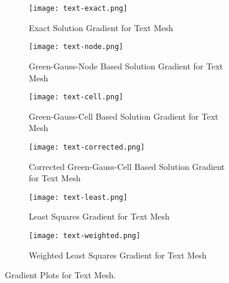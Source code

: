\documentclass{article}
\begin{document}
\begin{figure}[H]
  \centering
  \captionsetup{font=small}
  \begin{subfigure}{.45\textwidth}
    \centering
    \texttt{[image: text-exact.png]}
    \caption{Exact Solution Gradient for Text Mesh}
    \label{fig:41}
  \end{subfigure}%
  \hfill
  \begin{subfigure}{.45\textwidth}
    \centering
    \texttt{[image: text-node.png]}
    \caption{Green-Gauss-Node Based Solution Gradient for Text Mesh}
    \label{fig:42}
  \end{subfigure}

  \begin{subfigure}{.45\textwidth}
    \centering
    \texttt{[image: text-cell.png]}
    \caption{Green-Gauss-Cell Based Solution Gradient for Text Mesh}
    \label{fig:43}
  \end{subfigure}%
  \hfill
  \begin{subfigure}{.45\textwidth}
    \centering
    \texttt{[image: text-corrected.png]}
    \caption{Corrected Green-Gauss-Cell Based Solution Gradient for Text Mesh}
    \label{fig:44}
  \end{subfigure}

  \begin{subfigure}{.45\textwidth}
    \centering
    \texttt{[image: text-least.png]}
    \caption{Least Squares Gradient for Text Mesh}
    \label{fig:45}
  \end{subfigure}%
  \hfill
  \begin{subfigure}{.45\textwidth}
    \centering
    \texttt{[image: text-weighted.png]}
    \caption{Weighted Least Squares Gradient for Text Mesh}
    \label{fig:46}
  \end{subfigure}
  
  \caption{Gradient Plots for Text Mesh.}
  \label{fig:4}
\end{figure}
\end{document}

